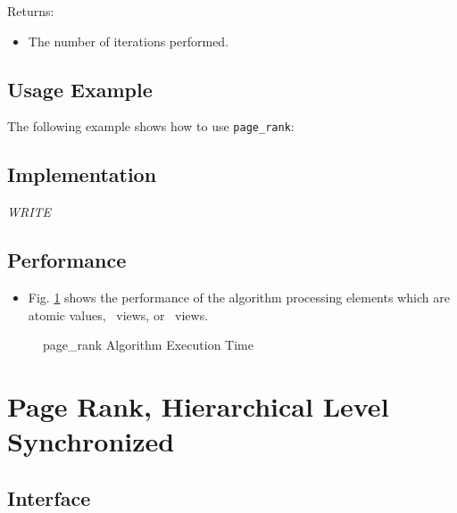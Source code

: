 Returns:
\begin{itemize}
\item
The number of iterations performed. 
\end{itemize}

\subsection{Usage Example} \label{sec-page-rank-alg-use}

The following example shows how to use 
\texttt{page\_rank}:


\subsection{Implementation} \label{sec-page-rank-alg-impl}

\textit{WRITE}

\subsection{Performance} \label{sec-page-rank-alg-perf}

\begin{itemize}
\item
Fig. \ref{fig:page-rank-alg-exec-exper}
shows the performance of the algorithm processing
elements which are atomic values, \stl\ views, or \stapl\ views.
\end{itemize}

\begin{figure}[p]
\caption{ page\_rank Algorithm Execution Time}
\label{fig:page-rank-alg-exec-exper}
\end{figure}


\section{ Page Rank, Hierarchical Level Synchronized}
\label{sec-page-rank-h-alg}

\subsection{Interface} \label{sec-page-rank-h-alg-inter}

